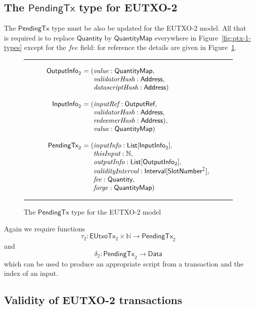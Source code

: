 \documentclass[a4paper]{article}
\renewcommand{\i}{\textit}  %
\newcommand{\s}{\textsf}  %
\newenvironment{arraydefs}[1]{\setlength{\arraycolsep}{0pt}\begin{array}{#1}}{\end{array}}
\newcommand\rfskip{7pt}
\newenvironment{ruledfigure}[1]{\begin{figure}[#1]\hrule\vspace{\rfskip}}{\vspace{\rfskip}\hrule\end{figure}}
\newcommand{\List}[1]{\ensuremath{\s{List}[#1]}}
\newcommand{\Interval}[1]{\ensuremath{\s{Interval}[#1]}}
\newcommand{\extended}[1]{#1^\updownarrow}
\newcommand{\ptx}{\ensuremath{\s{PendingTx}}}
\newcommand{\mi}[1]{\ensuremath{\mathit{#1}}}
\newcommand{\forge}{\mi{forge}}
\newcommand{\fee}{\mi{fee}}
\newcommand{\Data}{\ensuremath{\mathsf{Data}}}
\newcommand{\msf}[1]{\ensuremath{\mathsf{#1}}}
\newcommand{\slotnum}{\msf{SlotNumber}}
\newcommand{\eutxotx}{\msf{EUtxoTx}}
\newcommand{\qty}{\ensuremath{\s{Quantity}}}
\newcommand{\qtymap}{\ensuremath{\s{QuantityMap}}}
\newcommand\N{\ensuremath{\mathbb{N}}}
\begin{document}
\subsection{The \ptx{} type for EUTXO-2}
\label{sec:pendingtx-2}
The \ptx{} type must be also be updated for the EUTXO-2 model.  All
that is required is to replace \qty{} by \qtymap{} everywhere in
Figure~\ref{fig:ptx-1-types} except for the \fee{} field: for reference
the details are given in Figure~\ref{fig:ptx-2-types}.
\begin{ruledfigure}{H}
  \[
  \begin{arraydefs}{rll}

    \s{OutputInfo}_2\s{ } &= (& \i{value}: \qtymap,\\
    && \i{validatorHash}: \s{Address},\\
    &&  \i{datascriptHash}: \s{Address})\\
    \\
    \s{InputInfo}_2\s{ }& = (&\i{inputRef}: \s{OutputRef},\\
                 && \i{validatorHash}: \s{Address},\\
                 && \i{redeemerHash}: \s{Address}),\\
                 && \i{value}: \qtymap)\\
     \\
     \ptx_2\s{ } &= (&\i{inputInfo}: \List{\s{InputInfo}_2},\\
     &&\i{thisInput}: \N,\\
     &&\i{outputInfo}: \List{\s{OutputInfo$_2$}},\\
     &&\i{validityInterval}: \Interval{\extended{\slotnum}},\\
     &&\fee: \qty,\\
     &&\forge: \qtymap)
   \end{arraydefs}
 \]
  \caption{The \ptx{} type for the EUTXO-2 model}
  \label{fig:ptx-2-types}
\end{ruledfigure}

\noindent Again we require functions
$$
\tau_2: \eutxotx_2 \times \N \rightarrow \ptx_2
$$
and
$$
\delta_2: \ptx_2 \rightarrow \Data
$$
which can be used to produce an appropriate script from a transaction
and the index of an input.

\subsection{Validity of EUTXO-2 transactions}
\label{sec:eutxo-2-validity}
\end{document}
